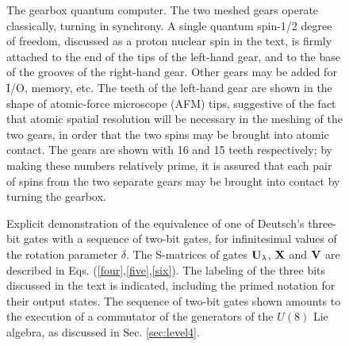 \begin{figure}
\caption{
The gearbox quantum computer.  The two meshed gears operate
classically, turning in synchrony.  A single quantum spin-1/2 degree of
freedom, discussed as a proton nuclear spin in the text, is firmly
attached to the end of the tips of the left-hand gear, and to the base
of the grooves of the right-hand gear.  Other gears may be added for
I/O, memory, etc.  The teeth of the left-hand gear are shown in the
shape of atomic-force microscope (AFM) tips, suggestive of the fact that
atomic spatial resolution will be necessary in the meshing of the two
gears, in order that the two spins may be brought into atomic contact.
The gears are shown with 16 and 15 teeth respectively; by making these
numbers relatively prime, it is assured that each pair of spins from the
two separate gears
may be brought into contact by turning the gearbox.}
\label{qcomp01}
\end{figure}

\begin{figure}
\caption{
Explicit demonstration of the equivalence of one of Deutsch's
three-bit gates with a sequence of two-bit gates, for infinitesimal
values of the rotation parameter $\delta$.  The S-matrices of gates ${\bf U}_
\lambda$, ${\bf X}$ and ${\bf V}$ are
described in Eqs. (\protect\ref{four},\protect\ref{five},\protect\ref{six}).
The labeling of the three bits discussed in the text is indicated,
including the primed notation for their output states.  The sequence
of two-bit gates
shown amounts to the execution of a
commutator of the generators of the $U(8)$
Lie algebra, as discussed in Sec. \protect\ref{sec:level4}.}
\label{qcomp02}
\end{figure}



